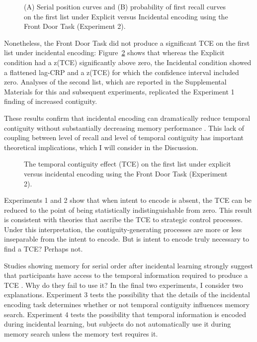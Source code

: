 \documentclass[man,natbib,floatsintext]{apa6} %
\begin{document}
\begin{figure}
\caption{(A) Serial position curves and (B) probability of first recall curves on the first list under Explicit versus Incidental encoding using the Front Door Task (Experiment 2).\spcpaneltext}
\label{e2_l1_spc}
\end{figure}

Nonetheless, the Front Door Task did not produce a significant TCE on the first list under incidental encoding: Figure~\ref{e2_l1_crp} shows that whereas the Explicit condition  had a z(TCE) significantly above zero, the Incidental condition showed a flattened lag-CRP and a z(TCE) for which the confidence interval included zero.  Analyses of the second list, which are reported in the Supplemental Materials for this and subsequent experiments, replicated the Experiment 1 finding of increased contiguity. 

These results confirm that incidental encoding can dramatically reduce temporal contiguity without substantially decreasing memory performance \citep{NairEtal17}. This lack of coupling between level of recall and level of temporal contiguity has important theoretical implications, which I will consider in the Discussion.

\begin{figure}%
\caption{The temporal contiguity effect (TCE) on the first list under explicit versus incidental encoding using the Front Door Task (Experiment 2).\paneltext}
\label{e2_l1_crp}
\end{figure}

Experiments 1 and 2 show that when intent to encode is absent, the TCE can be reduced to the point of being statistically indistinguishable from zero. This result is consistent with theories that ascribe the TCE to strategic control processes. Under this interpretation, the contiguity-generating processes are more or less inseparable from the intent to encode. But is intent to encode truly necessary to find a TCE? Perhaps not.

Studies showing memory for serial order after incidental learning strongly suggest that participants have access to the temporal information required to produce a TCE \citep{Nair91,Nair90b}. Why do they fail to use it? In the final two experiments, I consider two explanations. Experiment 3 tests the possibility that the details of the incidental encoding task determines whether or not temporal contiguity influences memory search. Experiment 4 tests the possibility that temporal information is encoded during incidental learning, but subjects do not automatically use it during memory search unless the memory test requires it.
\end{document}
